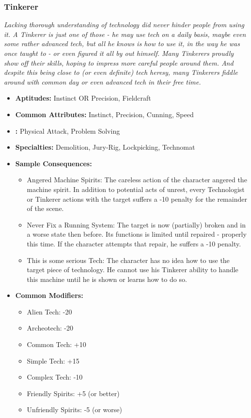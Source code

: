 	\subsubsection{Tinkerer}\label{Tinkerer}
		\textit{Lacking thorough understanding of technology did never hinder people from using it.
		A Tinkerer is just one of those - he may use tech on a daily basis, maybe even some rather advanced tech, but all he knows is how to use it, in the way he was once taught to - or even figured it all by out himself.
		Many Tinkerers proudly show off their skills, hoping to impress more careful people around them.
		And despite this being close to (or even definite) tech heresy, many Tinkerers fiddle around with common day or even advanced tech in their free time.}
		\begin{itemize}
			\item \textbf{Aptitudes:} Instinct OR Precision, Fieldcraft
			\item \textbf{Common Attributes:} Instinct, Precision, Cunning, Speed
			\item \textbf{:} Physical Attack, Problem Solving
			\item \textbf{Specialties:} Demolition, Jury-Rig, Lockpicking, Technomat
			\item \textbf{Sample Consequences:} 
			\begin{itemize}
				\item Angered Machine Spirits: The careless action of the character angered the machine spirit. In addition to potential acts of unrest, every Technologist or Tinkerer actions with the target suffers a -10 penalty for the remainder of the scene.
				\item Never Fix a Running System: The target is now (partially) broken and in a worse state then before. Its functions is limited until repaired - properly this time. If the character attempts that repair, he suffers a -10 penalty.
				\item This is some serious Tech: The character has no idea how to use the target piece of technology. He cannot use his Tinkerer ability to handle this machine until he is shown or learns how to do so.
			\end{itemize}
			\item \textbf{Common Modifiers:}
			\begin{itemize}
				\item Alien Tech: -20
				\item Archeotech: -20
				\item Common Tech: +10
				\item Simple Tech: +15
				\item Complex Tech: -10
				\item Friendly Spirits: +5 (or better)
				\item Unfriendly Spirits: -5 (or worse)
			\end{itemize}
		\end{itemize}

